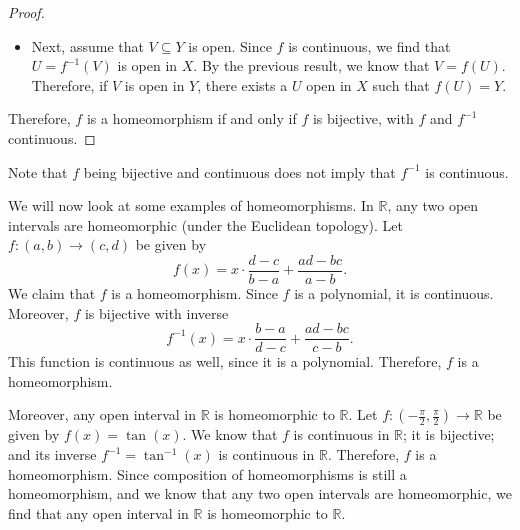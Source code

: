 \documentclass[a4paper, openany]{memoir}
\theoremstyle{definition}
\theoremstyle{plain}
\begin{document}
\begin{proof}
\begin{itemize}
\begin{itemize}
        \item Next, assume that $V \subseteq Y$ is open. Since $f$ is continuous, we find that $U = f^{-1}(V)$ is open in $X$. By the previous result, we know that $V = f(U)$. Therefore, if $V$ is open in $Y$, there exists a $U$ open in $X$ such that $f(U) = Y$.
    \end{itemize}
\end{itemize}
Therefore, $f$ is a homeomorphism if and only if $f$ is bijective, with $f$ and $f^{-1}$ continuous.
\end{proof}
\noindent Note that $f$ being bijective and continuous does not imply that $f^{-1}$ is continuous.

We will now look at some examples of homeomorphisms. In $\mathbb{R}$, any two open intervals are homeomorphic (under the Euclidean topology). Let $f: (a, b) \to (c, d)$ be given by 
\[f(x) = x \cdot \frac{d - c}{b - a} + \frac{ad - bc}{a - b}.\]
We claim that $f$ is a homeomorphism. Since $f$ is a polynomial, it is continuous. Moreover, $f$ is bijective with inverse
\[f^{-1}(x) = x \cdot \frac{b - a}{d - c} + \frac{ad - bc}{c - b}.\]
This function is continuous as well, since it is a polynomial. Therefore, $f$ is a homeomorphism.

Moreover, any open interval in $\mathbb{R}$ is homeomorphic to $\mathbb{R}$. Let $f: (-\frac{\pi}{2}, \frac{\pi}{2}) \to \mathbb{R}$ be given by $f(x) = \tan (x)$. We know that $f$ is continuous in $\mathbb{R}$; it is bijective; and its inverse $f^{-1} = \tan^{-1} (x)$ is continuous in $\mathbb{R}$. Therefore, $f$ is a homeomorphism. Since composition of homeomorphisms is still a homeomorphism, and we know that any two open intervals are homeomorphic, we find that any open interval in $\mathbb{R}$ is homeomorphic to $\mathbb{R}$.
\end{document}
